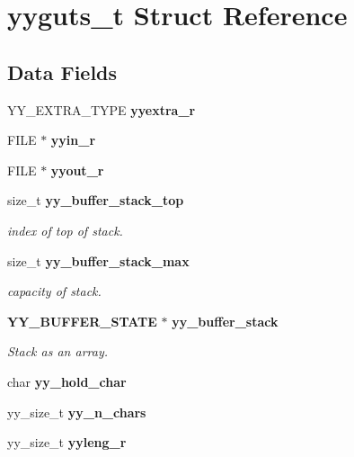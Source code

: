 \section{yyguts\-\_\-t Struct Reference}
\label{structyyguts__t}
\subsection*{Data Fields}
\begin{DoxyCompactItemize}
\item 
Y\-Y\-\_\-\-E\-X\-T\-R\-A\-\_\-\-T\-Y\-P\-E {\bfseries yyextra\-\_\-r}\label{structyyguts__t_aef05c0d6725a5214f6b30466f0b01c47}

\item 
F\-I\-L\-E $\ast$ {\bfseries yyin\-\_\-r}\label{structyyguts__t_a21f81ca100b12364a5095a37d1c6f650}

\item 
F\-I\-L\-E $\ast$ {\bfseries yyout\-\_\-r}\label{structyyguts__t_a436368a905aaf12e809e265749c74031}

\item 
size\-\_\-t {\bf yy\-\_\-buffer\-\_\-stack\-\_\-top}
\begin{DoxyCompactList}\small\item\em index of top of stack. \end{DoxyCompactList}\item 
size\-\_\-t {\bf yy\-\_\-buffer\-\_\-stack\-\_\-max}
\begin{DoxyCompactList}\small\item\em capacity of stack. \end{DoxyCompactList}\item 
{\bf Y\-Y\-\_\-\-B\-U\-F\-F\-E\-R\-\_\-\-S\-T\-A\-T\-E} $\ast$ {\bf yy\-\_\-buffer\-\_\-stack}
\begin{DoxyCompactList}\small\item\em Stack as an array. \end{DoxyCompactList}\item 
char {\bfseries yy\-\_\-hold\-\_\-char}\label{structyyguts__t_adde3f71374c223bbac47284824996e86}

\item 
yy\-\_\-size\-\_\-t {\bfseries yy\-\_\-n\-\_\-chars}\label{structyyguts__t_ac9eb8a4cedd3008b47b7644692b93a3f}

\item 
yy\-\_\-size\-\_\-t {\bfseries yyleng\-\_\-r}\label{structyyguts__t_ab55d594683be54bcd45a64c4bf26427e}


\end{DoxyCompactItemize}
